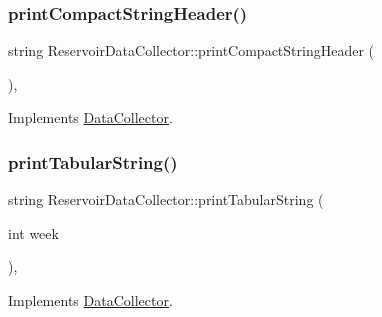 \mbox{\label{classReservoirDataCollector_aa8346433f037bbca41f3c8450f7f88cf_aa8346433f037bbca41f3c8450f7f88cf}} 
\subsubsection{\texorpdfstring{print\+Compact\+String\+Header()}{printCompactStringHeader()}}
{\footnotesize\ttfamily string Reservoir\+Data\+Collector\+::print\+Compact\+String\+Header (\begin{DoxyParamCaption}{ }\end{DoxyParamCaption})\hspace{0.3cm}{\ttfamily [override]}, {\ttfamily [virtual]}}



Implements \mbox{\hyperlink{classDataCollector_a98dcb4ec871d9c7fbf7545c64e5ccc67_a98dcb4ec871d9c7fbf7545c64e5ccc67}{Data\+Collector}}.

\mbox{\label{classReservoirDataCollector_a81777b029bf26be403b9f4d67f01588b_a81777b029bf26be403b9f4d67f01588b}} 
\subsubsection{\texorpdfstring{print\+Tabular\+String()}{printTabularString()}}
{\footnotesize\ttfamily string Reservoir\+Data\+Collector\+::print\+Tabular\+String (\begin{DoxyParamCaption}\item[{int}]{week }\end{DoxyParamCaption})\hspace{0.3cm}{\ttfamily [override]}, {\ttfamily [virtual]}}



Implements \mbox{\hyperlink{classDataCollector_a397fccabe0223267eea8fc7cac0e59da_a397fccabe0223267eea8fc7cac0e59da}{Data\+Collector}}.

